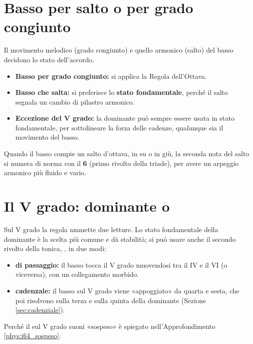 \section{Basso per salto o per grado congiunto}
\label{sec:basso_salti_gradi}

Il movimento melodico (grado congiunto) e quello armonico (salto) del basso decidono lo stato dell'accordo.

\begin{regola}
	\label{reg:stato_basso}
	\begin{itemize}
		\item \textbf{Basso per grado congiunto:} si applica la Regola dell'Ottava.
		\item \textbf{Basso che salta:} si preferisce lo \textbf{stato fondamentale}, perché il salto segnala un cambio di pilastro armonico.
		\item \textbf{Eccezione del V grado:} la dominante può sempre essere usata in stato fondamentale, per sottolineare la forza delle cadenze, qualunque sia il movimento del basso.
	\end{itemize}
\end{regola}

\begin{regola}
	\label{reg:salto_ottava_basso}
	Quando il basso compie un salto d'ottava, in su o in giù, la seconda nota del salto si numera di norma con il \textbf{6} (primo rivolto della triade), per avere un arpeggio armonico più fluido e vario.
\end{regola}

\section{Il V grado: dominante o }
\label{sec:secondo_rivolto_regola}

Sul V grado la regola ammette due letture. Lo stato fondamentale della dominante è la scelta più comune e dà stabilità; si può usare anche il secondo rivolto della tonica, , in due modi:

\begin{itemize}
	\item \textbf{ di passaggio:} il basso tocca il V grado muovendosi tra il IV e il VI (o viceversa), con un collegamento morbido.
	\item \textbf{ cadenzale:} il basso sul V grado viene «appoggiato» da quarta e sesta, che poi risolvono sulla terza e sulla quinta della dominante (Sezione \ref{sec:cadenziale}).
\end{itemize}

Perché il  sul V grado suoni «sospeso» è spiegato nell'Approfondimento \ref{phys:i64_sospeso}.
